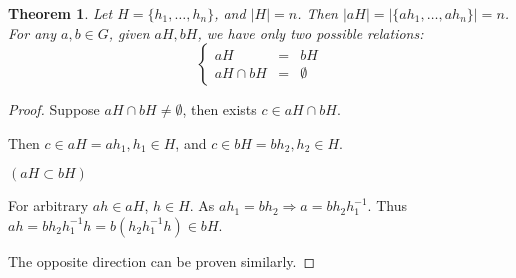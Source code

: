 \documentclass{article}
\theoremstyle{MyNonumberplain}
\theoremstyle{break}
\newtheorem*{proof}{Proof. }
\theoremstyle{break}
\newtheorem{theorem}{Theorem}[section]
\theoremstyle{break}
\theoremstyle{definition}
\theoremstyle{break}
\begin{document}
\begin{thmbox}
    \begin{theorem}
        Let $H = \{ h_1, \ldots, h_n \}$, and $| H | = n$. Then $| a H | = | \{ a h_1,
        \ldots, a h_n \} | = n$. For any $a, b \in G$, given $a H, b H$, we have only two possible relations:
        $$\left\{\begin{array}{lll}
        a H & = & b H\\
        a H \cap b H & = & \emptyset
        \end{array}\right.$$
    \end{theorem}
    \begin{prfbox}
        \begin{proof}
            Suppose $a H \cap b H \neq \emptyset$, then exists $c \in a H \cap b H$.\bigskip

            Then $c \in a H = a h_1, h_1 \in H$, and $c \in b H = b h_2, h_2 \in H$.\bigskip
            
            $(a H \subset b H)$\bigskip
            
            For arbitrary $a h \in a H$, $h \in H$. As $a h_1 = b h_2 \Rightarrow a = b
            h_2 h^{- 1}_1$. Thus $a h = b h_2 h^{- 1}_1 h = b (h_2 h^{- 1}_1 h) \in b H$.\bigskip
            
            The opposite direction can be proven similarly. 
        \end{proof}
    \end{prfbox}
\end{thmbox}
\end{document}
